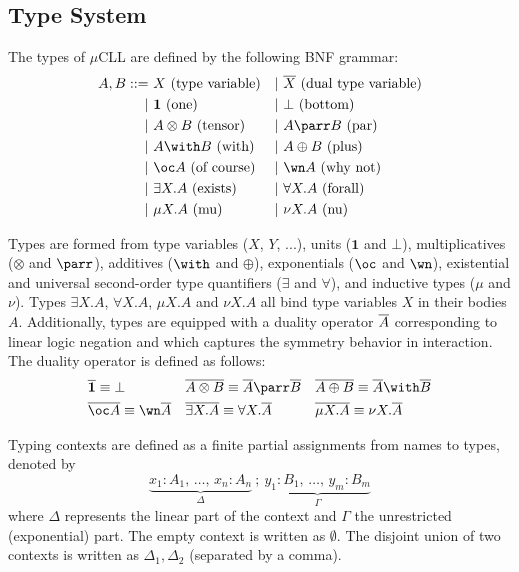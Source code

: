 \subsection{Type System}

The types of $\mu$CLL are defined by the following BNF grammar:
$$\begin{aligned}
    A, B ::=\  & X \text{ (type variable)}    &  & |\ \dual{X} \text{ (dual type variable)} \\
    |\         & \mathbf{1} \text{ (one)}     &  & |\ \bot \text{ (bottom)}                 \\
    |\         & A \otimes B \text{ (tensor)} &  & |\ A \parr B \text{ (par)}               \\
    |\         & A \with B \text{ (with)}     &  & |\ A \oplus B \text{ (plus)}             \\
    |\         & \oc A \text{ (of course)}    &  & |\ \wn A \text{ (why not)}               \\
    |\         & \exists X.A \text{ (exists)} &  & |\ \forall X.A \text{ (forall)}          \\
    |\         & \mu X.A \text{ (mu)}         &  & |\ \nu X.A \text{ (nu)}
\end{aligned}$$

Types are formed from type variables ($X$, $Y$, ...), units ($\mathbf{1}$ and $\bot$), multiplicatives ($\otimes$ and $\parr$), additives ($\with$ and $\oplus$), exponentials ($\oc$ and $\wn$), existential and universal second-order type quantifiers ($\exists$ and $\forall$), and inductive types ($\mu$ and $\nu$). Types $\exists X.A$, $\forall X.A$, $\mu X.A$ and $\nu X.A$ all bind type variables $X$ in their bodies $A$. Additionally, types are equipped with a duality operator $\overline{A}$ corresponding to linear logic negation and which captures the symmetry behavior in interaction. The duality operator is defined as follows:
$$\begin{aligned}
    & \dual{\mathbf{1}} \equiv \bot    &  & \dual{A \otimes B} \equiv \dual{A} \parr \dual{B} &  & \dual{A \oplus B} \equiv \dual{A} \with \dual{B} \\
    & \dual{\oc A} \equiv \wn \dual{A} &  & \dual{\exists X.A} \equiv \forall X.\dual{A}      &  & \dual{\mu X.A} \equiv \nu X.\dual{A}
\end{aligned}$$

Typing contexts are defined as a finite partial assignments from names to types, denoted by
\[
    \underbrace{x_1 : A_1,\,\dots,\,x_n : A_n}_\Delta\ ;\
    \underbrace{y_1 : B_1,\,\dots,\,y_m : B_m}_\Gamma
\]
where $\Delta$ represents the linear part of the context and $\Gamma$ the unrestricted (exponential) part. The empty context is written as $\emptyset$. The disjoint union of two contexts is written as $\Delta_1, \Delta_2$ (separated by a comma).


